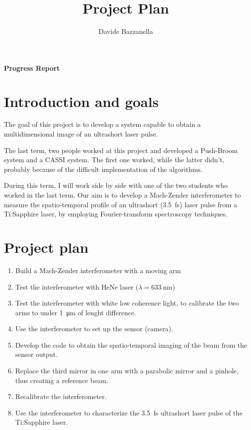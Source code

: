 \documentclass[12pt,a4paper]{report}
\author{Davide Bazzanella}
\title{Project Plan}
\begin{document}
\textbf{\Huge{Progress Report}}
\section*{Introduction and goals}
The goal of this project is to develop a system capable to obtain a multidimensional image of an ultrashort laser pulse.

The last term, two people worked at this project and developed a Push-Broom system and a CASSI system.
The first one worked, while the latter didn't, probably because of the difficult implementation of the algorithms.

During this term, I will work side by side with one of the two students who worked in the last term.
Our aim is to develop a Mach-Zender interferometer to measure the spatio-temporal profile of an ultrashort (\SI{3.5}{\fs}) laser pulse from a Ti:Sapphire laser, by employing Fourier-transform spectroscopy techniques.

\section*{Project plan}
\begin{enumerate}
\item Build a Mach-Zender interferometer with a moving arm
\item Test the interferometer with HeNe laser ($\lambda = \SI{633}{\nm}$)
\item Test the interferometer with white low coherence light, to calibrate the two arms to under \SI{1}{\um} of lenght difference.
\item Use the interferometer to set up the sensor (camera).
\item Develop the code to obtain the spatio-temporal imaging of the beam from the sensor output.
\item Replace the third mirror in one arm with a parabolic mirror and a pinhole, thus creating a reference beam.
\item Recalibrate the interferometer.
\item Use the interferometer to characterize the \SI{3.5}{\fs} ultrashort laser pulse of the Ti:Sapphire laser.
\end{enumerate}
\end{document}
